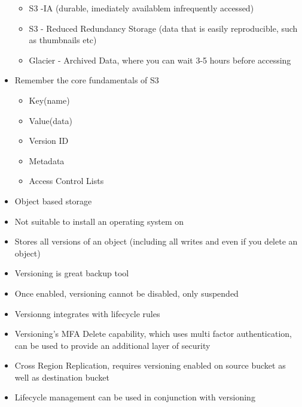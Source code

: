 \documentclass{article}
\begin{document}
\begin{itemize}
\begin{itemize}
	\item
	S3 -IA (durable, imediately availablem infrequently accessed)
	
	\item
	S3 - Reduced Redundancy Storage (data that is easily reproducible, such as thumbnails etc)
	
	\item
	Glacier - Archived Data, where you can wait 3-5  hours before accessing
	\end{itemize}

\item
Remember the core fundamentals of S3
	\begin{itemize}
	\item
	Key(name)
	
	\item	
	Value(data)
	
	\item
	Version ID
	
	\item
	Metadata
	
	\item
	Access Control Lists
	\end{itemize}

\item
Object based storage

\item
Not suitable to install an operating system on

\item
Stores all versions of an object (including all writes and even if you delete an object)

\item
Versioning is great backup tool

\item
Once enabled, versioning cannot be disabled, only suspended

\item
Versionng integrates with lifecycle rules

\item
Versioning's MFA Delete capability, which uses multi factor authentication, can be used to provide an additional layer of security

\item
Cross Region Replication, requires versioning enabled on source bucket as well as destination bucket

\item
Lifecycle management can be used in conjunction with versioning


\end{itemize}
\end{document}
